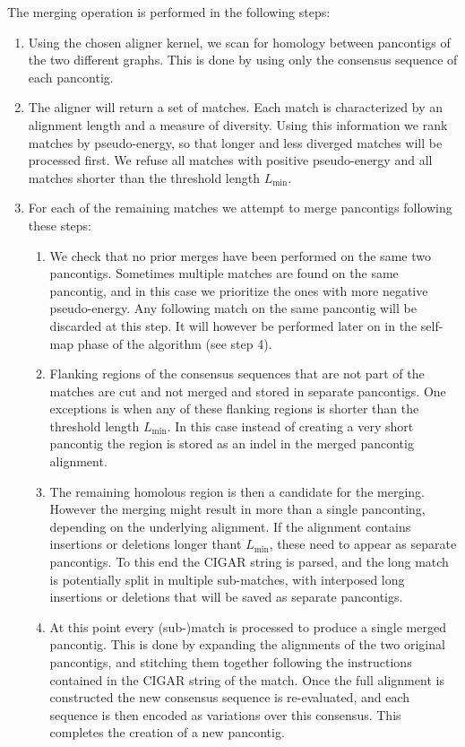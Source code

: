 \documentclass[aps,rmp,reprint,superscriptaddress,notitlepage,10pt,onecolumn]{revtex4-1}
\newcommand{\Lthr}{L_{\min}}
\begin{document}
The merging operation is performed in the following steps:
\begin{enumerate}
    \item Using the chosen aligner kernel, we scan for homology between pancontigs of the two different graphs. This is done by using only the consensus sequence of each pancontig.
    \item The aligner will return a set of matches. Each match is characterized by an alignment length and a measure of diversity. Using this information we rank matches by pseudo-energy, so that longer and less diverged matches will be processed first. We refuse all matches with positive pseudo-energy and all matches shorter than the threshold length $\Lthr$.
    \item For each of the remaining matches we attempt to merge pancontigs following these steps:
          \begin{enumerate}
              \item We check that no prior merges have been performed on the same two pancontigs. Sometimes multiple matches are found on the same pancontig, and in this case we prioritize the ones with more negative pseudo-energy. Any following match on the same pancontig will be discarded at this step. It will however be performed later on in the self-map phase of the algorithm (see step 4).
              \item Flanking regions of the consensus sequences that are not part of the matches are cut and not merged and stored in separate pancontigs. One exceptions is when any of these flanking regions is shorter than the threshold length $\Lthr$. In this case instead of creating a very short pancontig the region is stored as an indel in the merged pancontig alignment.
              \item The remaining homolous region is then a candidate for the merging. However the merging might result in more than a single panconting, depending on the underlying alignment. If the alignment contains insertions or deletions longer thant $\Lthr$, these need to appear as separate pancontigs. To this end the CIGAR string is parsed, and the long match is potentially split in multiple sub-matches, with interposed long insertions or deletions that will be saved as separate pancontigs.
              \item At this point every (sub-)match is processed to produce a single merged pancontig. This is done by expanding the alignments of the two original pancontigs, and stitching them together following the instructions contained in the CIGAR string of the match. Once the full alignment is constructed the new consensus sequence is re-evaluated, and each sequence is then encoded as variations over this consensus. This completes the creation of a new pancontig.

\end{enumerate}
\end{enumerate}
\end{document}
